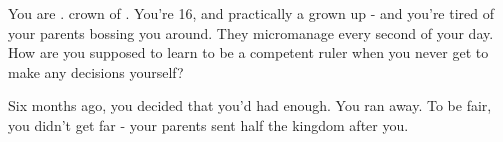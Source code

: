 \documentclass[char]{NeptuneBall}
\begin{document}
\name{\cWillow{}}
%

You are \cWillow{}. crown \cWillow{\prince} of \pAmerica{}. You're 16, and practically a grown up - and you're tired of your parents bossing you around. They micromanage every second of your day. How are you supposed to learn to be a competent ruler when you never get to make any decisions yourself?

Six months ago, you decided that you'd had enough. You ran away. To be fair, you didn't get far - your parents sent half the kingdom after you.


%
%
%
%
%
\end{document}
